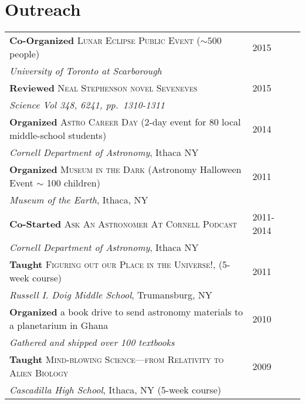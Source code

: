 \documentclass[10pt]{article} %
\begin{document}

\section{Outreach}

\begin{tabular}{l>{\hfill}p{2.7cm}r}
{\bf Co-Organized} \textsc{Lunar Eclipse Public Event} ($\sim 500$ people) & 2015\\
{\it University of Toronto at Scarborough} \\
{\bf Reviewed} \textsc{Neal Stephenson novel Seveneves} & 2015\\
{\it Science Vol 348, 6241, pp.~1310-1311} \\
{\bf Organized} \textsc{Astro Career Day} (2-day event for 80 local middle-school students) & 2014\\
{\it Cornell Department of Astronomy}, Ithaca NY \\
{\bf Organized} \textsc{Museum in the Dark} (Astronomy Halloween Event $\sim$ 100 children) & 2011\\
{\it Museum of the Earth}, Ithaca, NY \\
{\bf Co-Started} \textsc{Ask An Astronomer At Cornell Podcast} & 2011-2014\\
{\it Cornell Department of Astronomy}, Ithaca NY  \\
{\bf Taught} \textsc{Figuring out our Place in the Universe!}, (5-week course) & 2011\\ 
{\it Russell I. Doig Middle School}, Trumansburg, NY \\
{\bf Organized} a book drive to send astronomy materials to a planetarium in Ghana & 2010\\
{\it Gathered and shipped over 100 textbooks} \\
{\bf Taught} \textsc{Mind-blowing Science---from Relativity to Alien Biology} & 2009\\
{\it Cascadilla High School}, Ithaca, NY (5-week course) \\

\end{tabular}
\end{document}
